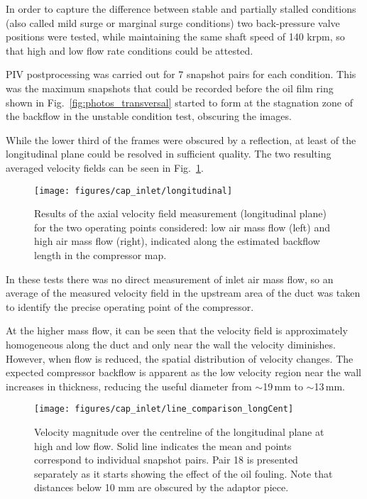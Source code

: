 In order to capture the difference between stable and partially stalled conditions (also called mild surge or marginal surge conditions) two back-pressure valve positions were tested, while maintaining the same shaft speed of 140 krpm, so that high and low flow rate conditions could be attested.

PIV postprocessing was carried out for 7 snapshot pairs for each condition. This was the maximum snapshots that could be recorded before the oil film ring shown in Fig.~\ref{fig:photos_transversal} started to form at the stagnation zone of the backflow in the unstable condition test, obscuring the images.

While the lower third of the frames were obscured by a reflection, at least  of the longitudinal plane could be resolved in sufficient quality. The two resulting averaged velocity fields can be seen in Fig.~\ref{fig:longitudinal}.

\begin{figure}[t!]
\hspace{-0.1\textwidth}
\texttt{[image: figures/cap\_inlet/longitudinal]}
\caption[Axial velocity fields measured by PIV]{Results of the axial velocity field measurement (longitudinal plane) for the two operating points considered: low air mass flow (left) and high air mass flow (right), indicated along the estimated backflow length in the compressor map.}
\label{fig:longitudinal}
\end{figure}

In these tests there was no direct measurement of inlet air mass flow, so an average of the measured velocity field in the upstream area of the duct was taken to identify the precise operating point of the compressor.

At the higher mass flow, it can be seen that the velocity field is approximately homogeneous along the duct and only near the wall the velocity diminishes. However, when flow is reduced, the spatial distribution of velocity changes. The expected compressor backflow is apparent as the low velocity region near the wall increases in thickness, reducing the useful diameter from $\sim$19\,mm to $\sim$13\,mm.

\begin{figure}[t!]
\centering
\texttt{[image: figures/cap\_inlet/line\_comparison\_longCent]}
\caption[Centreline velocity in the longitudinal plane]{Velocity magnitude over the centreline of the longitudinal plane at high and low flow. Solid line indicates the mean and points correspond to individual snapshot pairs. Pair 18 is presented separately as it starts showing the effect of the oil fouling. Note that distances below 10 mm are obscured by the adaptor piece.}
\label{fig:line_comp_long}
\end{figure}

